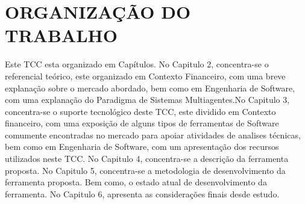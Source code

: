\section{ORGANIZAÇÃO DO TRABALHO}

Este TCC esta organizado em Capítulos. No Capitulo 2, concentra-se o referencial teórico, este organizado em Contexto Financeiro, com uma breve explanação sobre o mercado abordado, bem como em Engenharia de Software, com uma explanação do Paradigma de Sistemas Multiagentes.No Capitulo 3, concentra-se o suporte tecnológico deste TCC, este dividido em Contexto financeiro, com uma exposição de alguns tipos de ferramentas de Software comumente encontradas no mercado para apoiar atividades de analises técnicas, bem como em Engenharia de Software, com um apresentação dos recursos utilizados neste TCC. No Capitulo 4, concentra-se a descrição da ferramenta proposta. No Capitulo 5, concentra-se a metodologia de desenvolvimento da ferramenta proposta. Bem como, o estado atual de desenvolvimento da ferramenta. No Capitulo 6, apresenta as considerações finais desde estudo.